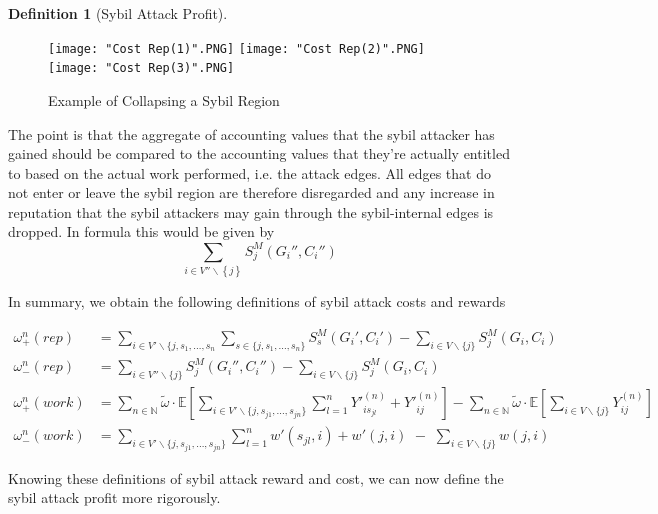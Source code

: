 \documentclass[11pt,a4paper]{report}
\theoremstyle{definition}
\newtheorem{definition}{Definition}[section]
\theoremstyle{theorem}
\theoremstyle{proposition}
\theoremstyle{corollary}
\theoremstyle{lemma}
\theoremstyle{example}
\theoremstyle{remark}
\begin{document}
\begin{definition}[Sybil Attack Profit]
\begin{figure}[H]
\begin{center}
\texttt{[image: "Cost Rep(1)".PNG]} 
\texttt{[image: "Cost Rep(2)".PNG]} 
\texttt{[image: "Cost Rep(3)".PNG]}
\caption{Example of Collapsing a Sybil Region}
\label{fig:Example of Collapsing a Sybil Region}
\end{center}
\end{figure}

\noindent{}The point is that the aggregate of accounting values that the sybil attacker has gained should be compared to the accounting values that they're actually entitled to based on the actual work performed, i.e. the attack edges. All edges that do not enter or leave the sybil region are therefore disregarded and any increase in reputation that the sybil attackers may gain through the sybil-internal edges is dropped. In formula this would be given by \vspace{1em}\\

\[
\sum\limits_{i\in{}V''\backslash\left\lbrace{}j\right\rbrace{}}S^M_j(G_i'',C_i'')
\]

\noindent{}In summary, we obtain the following definitions of sybil attack costs and rewards 

\begin{align*}
\omega_{+}^{n}(rep) &= \sum\limits_{i\in{}V'\backslash\lbrace{}j,s_1,\ldots,s_n}\sum\limits_{s\in\lbrace{}j,s_1,\ldots,s_n\rbrace}S^M_s(G_i',C_i') - \sum\limits_{i\in{}V\backslash\lbrace{}j\rbrace}S^M_j(G_i,C_i) \\
\omega_{-}^{n}(rep) &= \sum_{i\in{}V''\backslash\lbrace{}j\rbrace}S^M_j(G_i'',C_i'') - \sum\limits_{i\in{}V\backslash\lbrace{}j\rbrace}S_j^M(G_i,C_i) \\
\omega_{+}^{n}(work) &= \sum\limits_{n\in\mathbb{N}}\tilde{\omega}\cdot\mathbb{E}\left[\sum\limits_{i\in{}V'\backslash\lbrace{}j,s_{j1},\ldots,s_{jn}\rbrace}\sum\limits_{l=1}^{n}Y'^{(n)}_{is_{jl}} + Y'^{(n)}_{ij}\right] - \sum\limits_{n\in\mathbb{N}}\tilde{\omega}\cdot\mathbb{E}\left[\sum\limits_{i\in{}V\backslash\lbrace{}j\rbrace}Y^{(n)}_{ij}\right] \\
\omega_{-}^{n}(work) &= \sum\limits_{i\in{}V'\backslash\lbrace{}j,s_{j1},\ldots,s_{jn}\rbrace}\sum\limits_{l=1}^{n}w'(s_{jl},i) + w'(j,i) \,\, - \,\, \sum\limits_{i\in{}V\backslash\lbrace{}j\rbrace}w(j,i) 
\end{align*}

\noindent{}Knowing these definitions of sybil attack reward and cost, we can now define the sybil attack profit more rigorously. \vspace{1em}\\


\end{definition}
\end{document}
